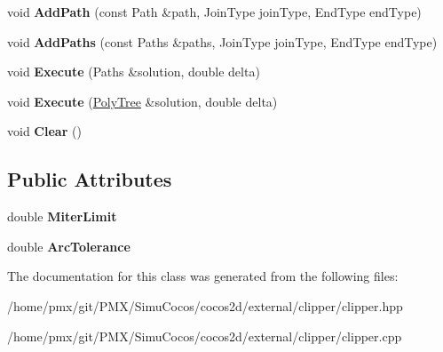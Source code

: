 \begin{DoxyCompactItemize}
\item 
\mbox{\label{classClipperLib_1_1ClipperOffset_a0cd68e3690072f510924a5b25291043b}} 
void {\bfseries Add\+Path} (const Path \&path, Join\+Type join\+Type, End\+Type end\+Type)
\item 
\mbox{\label{classClipperLib_1_1ClipperOffset_a18b35198f6370d76885af995ee2f16cb}} 
void {\bfseries Add\+Paths} (const Paths \&paths, Join\+Type join\+Type, End\+Type end\+Type)
\item 
\mbox{\label{classClipperLib_1_1ClipperOffset_ac591b25e483a52c99c3190a256ad4589}} 
void {\bfseries Execute} (Paths \&solution, double delta)
\item 
\mbox{\label{classClipperLib_1_1ClipperOffset_a3aaa9fcc20e503c967a23f1793536118}} 
void {\bfseries Execute} (\hyperlink{classClipperLib_1_1PolyTree}{Poly\+Tree} \&solution, double delta)
\item 
\mbox{\label{classClipperLib_1_1ClipperOffset_ab444433587b6a3f6c89655938d889c7d}} 
void {\bfseries Clear} ()
\end{DoxyCompactItemize}
\subsection*{Public Attributes}
\begin{DoxyCompactItemize}
\item 
\mbox{\label{classClipperLib_1_1ClipperOffset_a36b3bf4571e5b831edd584cbcb179246}} 
double {\bfseries Miter\+Limit}
\item 
\mbox{\label{classClipperLib_1_1ClipperOffset_a6c1735720b06e6b92dc25891014b2a92}} 
double {\bfseries Arc\+Tolerance}
\end{DoxyCompactItemize}


The documentation for this class was generated from the following files\+:\begin{DoxyCompactItemize}
\item 
/home/pmx/git/\+P\+M\+X/\+Simu\+Cocos/cocos2d/external/clipper/clipper.\+hpp\item 
/home/pmx/git/\+P\+M\+X/\+Simu\+Cocos/cocos2d/external/clipper/clipper.\+cpp\end{DoxyCompactItemize}
